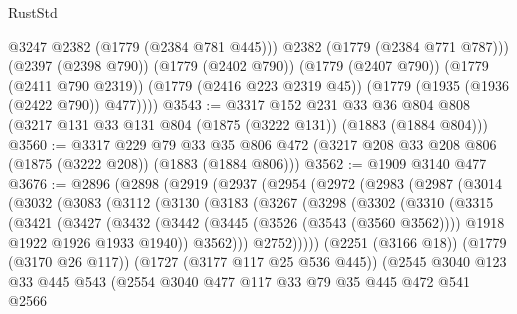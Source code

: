 \begin{lexlean}{RustStd}
\begin{coremodule}
{\begin{coremodule}
{{{{{{{{{{{            @3247
            @2382
            (@1779 (@2384 @781 @445)))
          @2382
          (@1779 (@2384 @771 @787)))
        (@2397 (@2398 @790))
        (@1779 (@2402 @790))
        (@1779 (@2407 @790))
        (@1779 (@2411 @790 @2319))
        (@1779 (@2416 @223 @2319 @45))
        (@1779 (@1935 (@1936 (@2422 @790)) @477))))
@3543 := @3317
    @152
    @231
    @33
    @36
    @804
    @808
    (@3217 @131 @33 @131 @804 (@1875 (@3222 @131)) (@1883 (@1884 @804)))
@3560 := @3317
    @229
    @79
    @33
    @35
    @806
    @472
    (@3217 @208 @33 @208 @806 (@1875 (@3222 @208)) (@1883 (@1884 @806)))
@3562 := @1909 @3140 @477
@3676 := @2896
    (@2898
      (@2919
        (@2937
          (@2954
            (@2972
              (@2983
                (@2987
                  (@3014
                    (@3032
                      (@3083
                        (@3112
                          (@3130
                            (@3183
                              (@3267
                                (@3298
                                  (@3302
                                    (@3310
                                      (@3315
                                        (@3421
                                          (@3427
                                            (@3432
                                              (@3442
                                                (@3445 (@3526 (@3543 (@3560 @3562))))
                                                @1918
                                                @1922
                                                @1926
                                                @1933
                                                @1940))
                                            @3562)))
                                      @2752)))))
                            (@2251 (@3166 @18))
                            (@1779 (@3170 @26 @117))
                            (@1727 (@3177 @117 @25 @536 @445))
                            (@2545
                              @3040
                              @123
                              @33
                              @445
                              @543
                              (@2554
                                @3040
                                @477
                                @117
                                @33
                                @79
                                @35
                                @445
                                @472
                                @541
                                @2566
}}}}}}}}}}}
\end{coremodule}}
\end{coremodule}
\end{lexlean}
